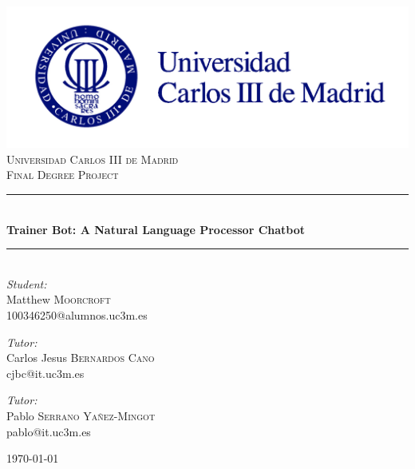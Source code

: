\newcommand{\HRule}{\rule{\linewidth}{0.5mm}}

\begin{titlingpage}
\begin{center}
 
\vfill
\includegraphics[scale=1.2]{./images/escudo}\\[3em]
\textsc{\LARGE Universidad Carlos III de Madrid}\\[0.5cm]
\textsc{\Large Final Degree Project}\\[0.5cm]

\HRule \\[0.6cm]
\textbf{\Large Trainer Bot: A Natural Language Processor Chatbot}\
\HRule \\[0.6cm]

\emph{\large Student:}\\
\large Matthew \textsc{\large Moorcroft}\\ \large 100346250@alumnos.uc3m.es \\[1.5cm]

\begin{minipage}{0.45\textwidth}
\begin{flushleft} \large
\emph{Tutor:} \\
Carlos Jesus \textsc{Bernardos Cano}\\
cjbc@it.uc3m.es 	
\end{flushleft}
\end{minipage}
\begin{minipage}{0.45\textwidth}
\begin{flushright} \large
\emph{Tutor:} \\
Pablo \textsc{Serrano Yañez-Mingot}\\
pablo@it.uc3m.es 
\end{flushright}

\end{minipage}
 
\vfill
 
{\large \today}
 
\end{center}

\end{titlingpage}